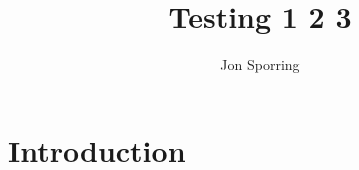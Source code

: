\documentclass{article}
\title{Testing 1 2 3}
\author{Jon Sporring}
\begin{document}
\maketitle
\section{Introduction}
\lipsum[2-4]
\end{document}
